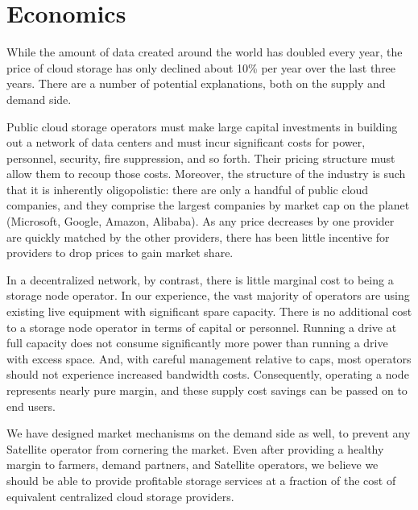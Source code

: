 \documentclass[8pt,fleqn,openany]{book}
\begin{document}
\section{Economics}

While the amount of data created around the world has doubled every year, the price of cloud
storage has only declined about 10\% per year over the last three years.
There are a number of potential explanations, both on the supply and demand
side.

Public cloud storage operators must make large capital investments in
building out a network of data centers and must incur significant costs for
power, personnel, security, fire suppression, and so forth. Their pricing structure
must allow them to recoup those costs. Moreover, the structure of the
industry is such that it is inherently oligopolistic: there are only a
handful of public cloud companies, and they comprise the largest companies by
market cap on the planet (Microsoft, Google, Amazon, Alibaba).
As any price decreases by one provider are quickly matched by the other
providers, there has been little incentive for providers to drop prices to
gain market share.

In a decentralized network, by contrast, there is little
marginal cost to being a storage node operator. In our experience, the vast
majority of operators are using existing live equipment with significant spare
capacity. There is no additional cost to a storage node operator in terms of
capital or personnel. Running a drive at full capacity does not consume
significantly more power than running a drive with excess space. And, with
careful management relative to caps, most operators should not experience
increased bandwidth costs. Consequently, operating a node represents nearly
pure margin, and these supply cost savings can be passed on to end users.

We have designed market mechanisms on the demand side as well, to prevent any
Satellite operator from cornering the market. Even after providing a healthy
margin to farmers, demand partners, and Satellite operators, we believe we
should be able to provide profitable storage services at a fraction of the cost
of equivalent centralized cloud storage providers.

\newpage
\raggedright


\end{document}
